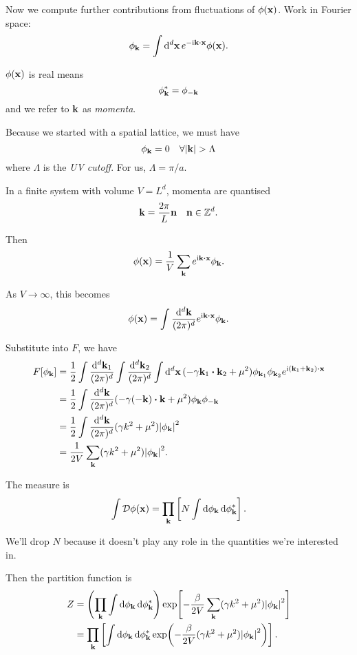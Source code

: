\documentclass[a4paper,11pt]{article}
\begin{document}
	Now we compute further contributions from fluctuations of $\phi(\vb x)$. Work in Fourier space:
	\[
		\phi _{\vb k} = \int \dd[d]{\vb x} e ^{- \mathrm{i} \vb k \vdot \vb x} \phi(\vb x).
	\]
	
	$\phi(\vb x)$ is real means
	\[
		\phi _{\vb k}^* = \phi _{- \vb k}
	\]
	and we refer to $\vb k$ as \emph{momenta}.

	Because we started with a spatial lattice, we must have
	\[
		\phi _{\vb k}= 0 \quad \forall \abs{\vb k} > \Lambda
	\]
	where $\Lambda$ is the \emph{UV cutoff}. For us, $\Lambda = \pi / a$.

	In a finite system with volume $V = L^d$, momenta are quantised
	\[
		\vb k = \frac{2 \pi}{L} \vb n \quad \vb n \in \mathbb{Z}^d.
	\]
	
	Then
	\[
		\phi(\vb x) = \frac{1}{V} \sum _{\vb k} e ^{\mathrm{i} \vb k \vdot \vb x} \phi _{\vb k}.
	\]
	
	As $V \to \infty$, this becomes
	\[
		\phi(\vb x) = \int \frac{\dd[d]{\vb k}}{(2 \pi)^d} e ^{\mathrm{i} \vb k \vdot \vb x} \phi _{\vb k}.
	\]
	
	Substitute into $F$, we have
	\begin{align*}
		F[\phi _{\vb k}] & = \frac{1}{2} \int \frac{\dd[d]{\vb k_1}}{(2 \pi)^d} \int \frac{\dd[d]{\vb k_2}}{(2\pi)^d} \int \dd[d]{\vb x} (-\gamma \vb k_1 \vdot \vb k_2 + \mu^2) \phi _{\vb k_1} \phi _{\vb k_2} e ^{\mathrm{i} (\vb k_1 + \vb k_2)\vdot \vb x}\\
		& = \frac{1}{2} \int \frac{\dd[d]{\vb k}}{(2 \pi)^d} (- \gamma(-\vb k)\vdot \vb k + \mu^2) \phi _{\vb k} \phi _{-\vb k}\\
		& = \frac{1}{2} \int \frac{\dd[d]{\vb k}}{(2 \pi)^d} (\gamma k^2 + \mu^2) \abs{\phi _{\vb k}}^2\\
		& = \frac{1}{2V} \sum _{\vb k} (\gamma k^2 + \mu^2) \abs{\phi _{\vb k}}^2.
	\end{align*}
	
	The measure is 
	\[
		\int \mathcal{D} \phi(\vb x) = \prod _{\vb k} \left[ N \int \dd{\phi _{\vb k}} \dd{\phi _{\vb k}^*} \right].
	\]

	\begin{nt}
		We'll drop $N$ because it doesn't play any role in the quantities we're interested in.
	\end{nt}

	Then the partition function is
	\begin{align*}
		Z & = \left( \prod _{\vb k}\int \dd{\phi _{\vb k}} \dd{\phi _{\vb k}^*} \right) \exp[- \frac{\beta}{2V}\sum _{\vb k}(\gamma k^2 + \mu^2)\abs{\phi _{\vb k}}^2]\\
		& = \prod _{\vb k}\left[ \int \dd{\phi _{\vb k}} \dd{\phi _{\vb k}^*} \exp(- \frac{\beta}{2V}(\gamma k^2 + \mu^2)\abs{\phi _{\vb k}}^2) \right].
	\end{align*}
\end{document}
